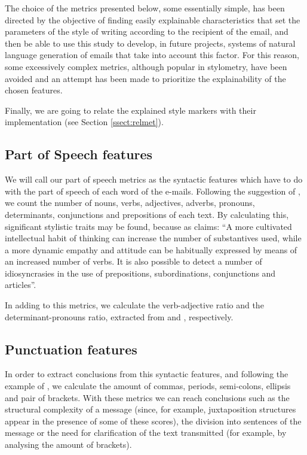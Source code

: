 The choice of the metrics presented below, some essentially simple, has been directed by the objective of finding easily explainable characteristics that set the parameters of the style of writing according to the recipient of the email, and then be able to use this study to develop, in future projects, systems of natural language generation of emails that take into account this factor. For this reason, some excessively complex metrics, although popular in stylometry, have been avoided and an attempt has been made to prioritize the explainability of the chosen features.

Finally, we are going to relate the explained style markers with their implementation (see Section \ref{ssect:relmet}).

\subsection{Part of Speech features}\label{ssect:posf}

We will call our part of speech metrics as the syntactic features which have to do with the part of speech of each word of the e-mails. Following the suggestion of \cite{holmes1985analysis}, we count the number of nouns, verbs, adjectives, adverbs, pronouns, determinants, conjunctions and prepositions of each text. By calculating this, significant stylistic traits may be found, because as \cite{somers1966statistical} claims: ``A more cultivated intellectual habit of thinking can increase the number of substantives used, while a more dynamic empathy and attitude can be habitually expressed by means of an increased number of verbs. It is also possible to detect a number of idiosyncrasies in the use of prepositions, subordinations, conjunctions and articles''.

In adding to this metrics, we calculate the verb-adjective ratio and the determinant-pronouns ratio, extracted from \cite{antosch1969diagnosis} and \cite{brainerd1974weighting}, respectively.

\subsection{Punctuation features}\label{ssect:punctf}

In order to extract conclusions from this syntactic features, and following the example of \cite{calix2008stylometry}, we calculate the amount of commas, periods, semi-colons, ellipsis and pair of brackets. With these metrics we can reach conclusions such as the structural complexity of a message (since, for example, juxtaposition structures appear in the presence of some of these scores), the division into sentences of the message or the need for clarification of the text transmitted (for example, by analysing the amount of brackets).

